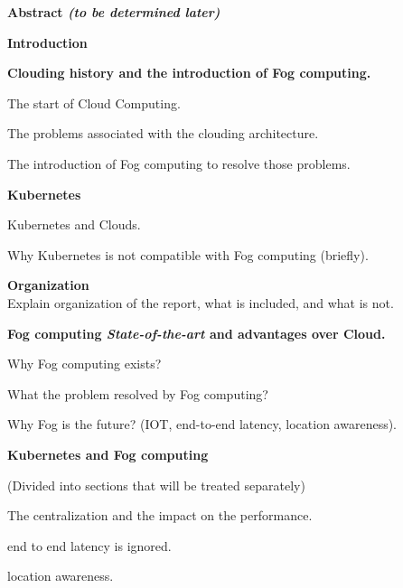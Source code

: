 \documentclass{report}
\begin{document}
	\begin{outline}
		\item {\bf Abstract {\em (to be determined later)}}
		\item {\bf Introduction }
  		\begin{outline}
			\item {\bf Clouding history and the introduction of Fog computing.} 
    		\begin{outline}
    			\item The start of Cloud Computing.
    			\item The problems associated with the clouding architecture. 
    			\item The introduction of Fog computing to resolve those problems. 
    		\end{outline}
    		\item {\bf Kubernetes}
    		\begin{outline}
				\item Kubernetes and Clouds.
				\item Why Kubernetes is not compatible with Fog computing (briefly).      	
    	
    		\end{outline}
    	\item {\bf Organization } \\
      		Explain organization of the report, what is included, and what is not.
     \end{outline}
    		
    		    	
	\item {\bf Fog computing {\em State-of-the-art} and advantages over Cloud. }
	\begin{outline}
	  	\item Why Fog computing exists? 
  		\item What the problem resolved by Fog computing?  
  		\item Why Fog is the future? (IOT, end-to-end latency, location awareness).
    \end{outline}
  
	\item {\bf Kubernetes and Fog computing }
	\begin{outline}
	\small (Divided into sections that will be treated separately)
		\item The centralization and the impact on the performance.
		\item end to end latency is ignored. 
		\item location awareness.
				

\end{outline}
\end{outline}
\end{document}
